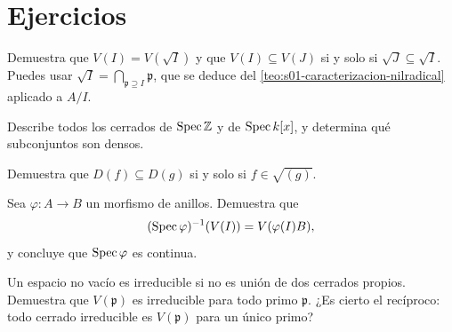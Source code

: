 \section{Ejercicios}

\begin{ejer}
\label{ejer:s02-demuestra-v-i-v-i}
Demuestra que $V(I)=V(\sqrt I)$ y que $V(I)\subseteq V(J)$ si y solo si $\sqrt J\subseteq\sqrt I$. Puedes usar $\sqrt I=\bigcap_{\mathfrak p\supseteq I}\mathfrak p$, que se deduce del \cref{teo:s01-caracterizacion-nilradical} aplicado a $A/I$.
\end{ejer}
\begin{ejer}
\label{ejer:s02-describe-todos-cerrados-z-k}
Describe todos los cerrados de $\operatorname{Spec}\mathbb Z$ y de $\operatorname{Spec} k[x]$, y determina qué subconjuntos son densos.
\end{ejer}
\begin{ejer}
\label{ejer:s02-demuestra-d-f-d-g}
Demuestra que $D(f)\subseteq D(g)$ si y solo si $f\in\sqrt{(g)}$.
\end{ejer}
\begin{ejer}
\label{ejer:s02-b-morfismo-anillos-demuestra-1}
Sea $\varphi\colon A\to B$ un morfismo de anillos. Demuestra que
\[
(\operatorname{Spec}\varphi)^{-1}(V(I))=V(\varphi(I)B),
\]
y concluye que $\operatorname{Spec}\varphi$ es continua.
\end{ejer}
\begin{ejer}
\label{ejer:s02-espacio-no-vacio-irreducible-no}
Un espacio no vacío es irreducible si no es unión de dos cerrados propios. Demuestra que $V(\mathfrak p)$ es irreducible para todo primo $\mathfrak p$. ¿Es cierto el recíproco: todo cerrado irreducible es $V(\mathfrak p)$ para un único primo?
\end{ejer}

